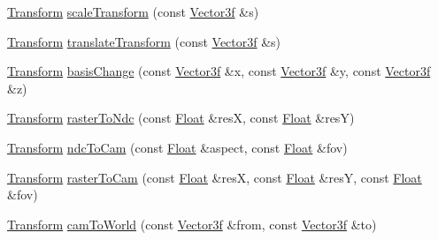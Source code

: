 \begin{DoxyCompactItemize}
\item 
\mbox{\hyperlink{classtransform_1_1Transform}{Transform}} \mbox{\hyperlink{namespacetransform_af72ab6b4dd785c317aa968420703e736}{scale\+Transform}} (const \mbox{\hyperlink{cyclop_8hpp_a5a0a2e85b081623ef3f7e7e8d43024f5}{Vector3f}} \&s)
\item 
\mbox{\hyperlink{classtransform_1_1Transform}{Transform}} \mbox{\hyperlink{namespacetransform_aaad998885f4db316ccfc1badca0198f2}{translate\+Transform}} (const \mbox{\hyperlink{cyclop_8hpp_a5a0a2e85b081623ef3f7e7e8d43024f5}{Vector3f}} \&s)
\item 
\mbox{\hyperlink{classtransform_1_1Transform}{Transform}} \mbox{\hyperlink{namespacetransform_ae8b8abac3c9545a9638557d140253085}{basis\+Change}} (const \mbox{\hyperlink{cyclop_8hpp_a5a0a2e85b081623ef3f7e7e8d43024f5}{Vector3f}} \&x, const \mbox{\hyperlink{cyclop_8hpp_a5a0a2e85b081623ef3f7e7e8d43024f5}{Vector3f}} \&y, const \mbox{\hyperlink{cyclop_8hpp_a5a0a2e85b081623ef3f7e7e8d43024f5}{Vector3f}} \&z)
\item 
\mbox{\hyperlink{classtransform_1_1Transform}{Transform}} \mbox{\hyperlink{namespacetransform_add6a8997ee9fc1593a97ec851a7e3d2e}{raster\+To\+Ndc}} (const \mbox{\hyperlink{cyclop_8hpp_a07afd7094cb489cbd514c76e6f55d34f}{Float}} \&resX, const \mbox{\hyperlink{cyclop_8hpp_a07afd7094cb489cbd514c76e6f55d34f}{Float}} \&resY)
\item 
\mbox{\hyperlink{classtransform_1_1Transform}{Transform}} \mbox{\hyperlink{namespacetransform_aea5616d1baa596de73167e91dc13c335}{ndc\+To\+Cam}} (const \mbox{\hyperlink{cyclop_8hpp_a07afd7094cb489cbd514c76e6f55d34f}{Float}} \&aspect, const \mbox{\hyperlink{cyclop_8hpp_a07afd7094cb489cbd514c76e6f55d34f}{Float}} \&fov)
\item 
\mbox{\hyperlink{classtransform_1_1Transform}{Transform}} \mbox{\hyperlink{namespacetransform_abe438e24da370c1a21b19492545f15ca}{raster\+To\+Cam}} (const \mbox{\hyperlink{cyclop_8hpp_a07afd7094cb489cbd514c76e6f55d34f}{Float}} \&resX, const \mbox{\hyperlink{cyclop_8hpp_a07afd7094cb489cbd514c76e6f55d34f}{Float}} \&resY, const \mbox{\hyperlink{cyclop_8hpp_a07afd7094cb489cbd514c76e6f55d34f}{Float}} \&fov)
\item 
\mbox{\hyperlink{classtransform_1_1Transform}{Transform}} \mbox{\hyperlink{namespacetransform_a3702053b4e20d89c0347d504ea013e15}{cam\+To\+World}} (const \mbox{\hyperlink{cyclop_8hpp_a5a0a2e85b081623ef3f7e7e8d43024f5}{Vector3f}} \&from, const \mbox{\hyperlink{cyclop_8hpp_a5a0a2e85b081623ef3f7e7e8d43024f5}{Vector3f}} \&to)

\end{DoxyCompactItemize}

